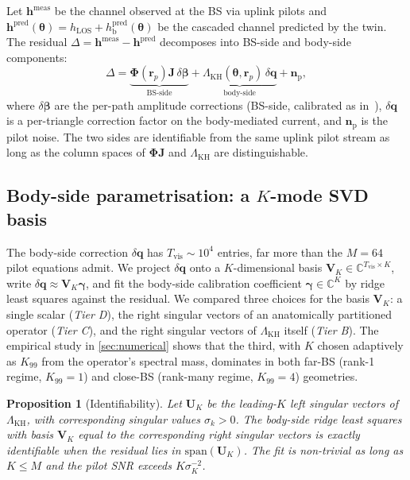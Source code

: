 \documentclass[journal,twocolumn,10pt]{IEEEtran}
\theoremstyle{plain}
\newtheorem{proposition}[theorem]{Proposition}
\theoremstyle{definition}
\theoremstyle{remark}
\newcommand{\rr}{\mathbf{r}}
\newcommand{\hh}{\mathbf{h}}
\newcommand{\Jmat}{\mathbf{J}}
\newcommand{\Phimat}{\mathbf{\Phi}}
\newcommand{\thetab}{\bm{\theta}}
\newcommand{\betab}{\bm{\beta}}
\newcommand{\gammab}{\bm{\gamma}}
\newcommand{\hLOS}{h_{\mathrm{LOS}}}
\newcommand{\hbody}{h_{\mathrm{b}}}
\newcommand{\Complex}{\mathbb{C}}
\begin{document}
Let $\hh^{\mathrm{meas}}$ be the channel observed at the BS via
uplink pilots and $\hh^{\mathrm{pred}}(\thetab) =
\hLOS + \hbody^{\mathrm{pred}}(\thetab)$ be the cascaded channel
predicted by the twin. The residual $\Delta = \hh^{\mathrm{meas}} -
\hh^{\mathrm{pred}}$ decomposes into BS-side and body-side
components:
\begin{equation}\label{eq:residual}
\Delta = \underbrace{\Phimat(\rr_p)\Jmat\,\delta\betab}_{\text{BS-side}}
+ \underbrace{\Lambda_{\mathrm{KH}}(\thetab,\rr_p)\,\delta\bm{q}}_{\text{body-side}}
+ \bm{n}_{\mathrm{p}},
\end{equation}
where $\delta\betab$ are the per-path amplitude corrections (BS-side,
calibrated as in~\cite{Wydaeghe2026jsacv5}), $\delta\bm{q}$ is a
per-triangle correction factor on the body-mediated current, and
$\bm{n}_{\mathrm{p}}$ is the pilot noise. The two sides are
identifiable from the same uplink pilot stream as long as the
column spaces of $\Phimat\Jmat$ and $\Lambda_{\mathrm{KH}}$ are
distinguishable.

\subsection{Body-side parametrisation: a $K$-mode SVD basis}

The body-side correction $\delta\bm{q}$ has $T_{\mathrm{vis}} \sim
10^{4}$ entries, far more than the $M = 64$ pilot equations admit.
We project $\delta\bm{q}$ onto a $K$-dimensional basis
$\bm{V}_K \in \Complex^{T_{\mathrm{vis}}\times K}$, write
$\delta\bm{q} \approx \bm{V}_K \gammab$, and fit the body-side
calibration coefficient $\gammab \in \Complex^{K}$ by ridge least
squares against the residual. We compared three choices for the
basis $\bm{V}_K$: a single scalar (\emph{Tier D}), the right
singular vectors of an anatomically partitioned operator
(\emph{Tier C}), and the right singular vectors of
$\Lambda_{\mathrm{KH}}$ itself (\emph{Tier B}). The empirical study
in \cref{sec:numerical} shows that the third, with $K$ chosen
adaptively as $K_{99}$ from the operator's spectral mass, dominates
in both far-BS (rank-1 regime, $K_{99} = 1$) and close-BS (rank-many
regime, $K_{99} = 4$) geometries.

\begin{proposition}[Identifiability]\label{prop:ident}
Let $\bm{U}_K$ be the leading-$K$ left singular vectors of
$\Lambda_{\mathrm{KH}}$, with corresponding singular values $\sigma_k
> 0$. The body-side ridge least squares with basis $\bm{V}_K$ equal
to the corresponding right singular vectors is exactly
identifiable when the residual lies in $\mathrm{span}(\bm{U}_K)$.
The fit is non-trivial as long as $K \leq M$ and the pilot SNR
exceeds $K \sigma_K^{-2}$.
\end{proposition}
\end{document}
